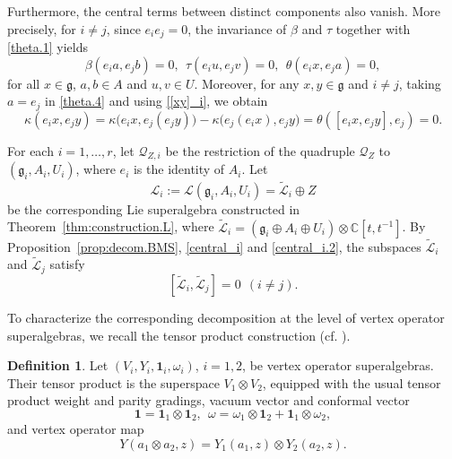 \documentclass[12pt]{article}
\numberwithin{equation}{section}
\theoremstyle{definition}
\newtheorem{definition}[theorem]{Definition}
\theoremstyle{plain}
\newcommand{\fg}{\mathfrak{g}}
\newcommand{\cQ}{\ensuremath{\mathcal{Q}}}
\newcommand{\cL}{\ensuremath{\mathcal{L}}}
\newcommand{\bone}{\mathbf{1 }}
\begin{document}
Furthermore, the central terms between distinct components also vanish. More precisely, for $i \neq j$, since $e_i   e_j = 0$, the invariance of $\beta$ and $\tau$ together with \eqref{theta.1} yields
\begin{equation}\label{central_i}
\beta(e_i  a, e_j  b)=0,\ \ \tau(e_iu, e_jv)=0, \ \ \theta(e_ix,e_j  a)=0,
\end{equation}
for all $x\in\fg$, $a,b\in A$ and $u,v\in U$. Moreover, for any $x,y\in\fg$ and $i\neq j$, taking $a=e_j$ in \eqref{theta.4} and using \eqref{[xy]_i}, we obtain
\begin{equation}\label{central_i.2}
\kappa(e_ix,e_jy)=\kappa\big(e_ix,e_j(e_jy)\big)-\kappa\big(e_j(e_ix),e_jy\big)=\theta([e_ix,e_jy],e_j)=0.
\end{equation}

For each $i= 1,\dots,r$, let $\cQ_{Z,i}$ be the restriction of the quadruple $\cQ_Z$ to $(\fg_i,A_i,U_i)$, where $e_i$ is the identity of $A_i$. Let
\begin{equation*}
    \cL_i:=\cL(\fg_i,A_i,U_i)=\widetilde{\cL}_i\oplus Z
\end{equation*}
be the corresponding Lie superalgebra constructed in Theorem~\ref{thm:construction.L}, where $\widetilde{\cL}_i=(\fg_i\oplus A_i\oplus U_i)\otimes\mathbb{C}[t,t^{-1}]$. By Proposition~\ref{prop:decom.BMS}, \eqref{central_i} and \eqref{central_i.2}, the subspaces $\widetilde{\cL}_i$ and $\widetilde{\cL}_j$ satisfy
\begin{equation}\label{L_i.commute}
[\widetilde{\cL}_i,\widetilde{\cL}_j]=0 \ \ (i\neq j).
\end{equation}

To characterize the corresponding decomposition at the level of vertex operator superalgebras, we recall the tensor product construction (cf. \cite{FHL,K98,Li}).

\begin{definition}
    Let $(V_i,Y_i,\bone_i,\omega_i)$, $i=1,2$, be vertex operator superalgebras. Their tensor product is the superspace $V_1\otimes V_2$, equipped with the usual tensor product weight and parity gradings, vacuum vector and conformal vector
\begin{equation*}
    \bone=\bone_1\otimes\bone_2,\ \ \omega=\omega_1\otimes\bone_2+\mathbf1_1\otimes\omega_2,
\end{equation*}
and vertex operator map
\begin{equation*}
    Y(a_1\otimes a_2,z)=Y_1(a_1,z)\otimes Y_2(a_2,z).
\end{equation*}
\end{definition}
\end{document}
